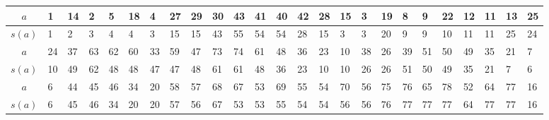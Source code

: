 \begin{center}
\begin{minipage}{\textwidth}
\renewcommand{\arraystretch}{1.1}
\begin{scriptsize}
\begin{tabular}{|c|*{24}{|p{.15cm}}|}
\hline
$a$&1&14&2&5&18&4&27&29&30&43&41&40&42&28&15&3&19&8&9&22&12&11&13&25 \\
\hline
$s(a)$&1&2&3&4&4&3&15&15&43&55&54&54&28&15&3&3&20&9&9&10&11&11&25&24\\
\hline \hline
$a$&24&37&63&62&60&33&59&47&73&74&61&48&36&23&10&38&26&39&51&50&49&35&21&7\\
\hline
$s(a)$&10&49&62&48&48&47&47&48&61&61&48&36&23&10&10&26&26&51&50&49&35&21&7&6\\
\hline \hline
$a$&6&44&45&46&34&20&58&57&68&67&53&69&55&54&70&56&75&76&65&78&52&64&77&16\\
\hline
$s(a)$&6&45&46&34&20&20&57&56&67&53&53&55&54&54&56&56&76&77&77&77&64&77&77&16\\
\hline
\end{tabular}
\end{scriptsize} 
\renewcommand{\arraystretch}{1}


\end{minipage}
\end{center}
